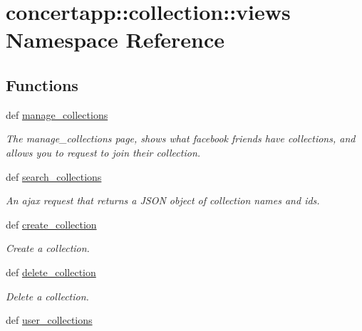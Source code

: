 \hypertarget{namespaceconcertapp_1_1collection_1_1views}{
\section{concertapp::collection::views Namespace Reference}
\label{namespaceconcertapp_1_1collection_1_1views}
}
\subsection*{Functions}
\begin{DoxyCompactItemize}
\item 
def \hyperlink{namespaceconcertapp_1_1collection_1_1views_a2f4c7bb502908e582ab456e2b0bd97cc}{manage\_\-collections}
\begin{DoxyCompactList}\small\item\em The manage\_\-collections page, shows what facebook friends have collections, and allows you to request to join their collection. \item\end{DoxyCompactList}\item 
def \hyperlink{namespaceconcertapp_1_1collection_1_1views_a3bbebfa032e3f8fe3b3e78054312b0af}{search\_\-collections}
\begin{DoxyCompactList}\small\item\em An ajax request that returns a JSON object of collection names and ids. \item\end{DoxyCompactList}\item 
def \hyperlink{namespaceconcertapp_1_1collection_1_1views_a9091899096b56e32b6687cc64f371dfb}{create\_\-collection}
\begin{DoxyCompactList}\small\item\em Create a collection. \item\end{DoxyCompactList}\item 
def \hyperlink{namespaceconcertapp_1_1collection_1_1views_a20f066a4de4aed16d1794cd102801cd8}{delete\_\-collection}
\begin{DoxyCompactList}\small\item\em Delete a collection. \item\end{DoxyCompactList}\item 
def \hyperlink{namespaceconcertapp_1_1collection_1_1views_aa83dd8eae86db95f0df851d648c9ae56}{user\_\-collections}

\end{DoxyCompactItemize}
